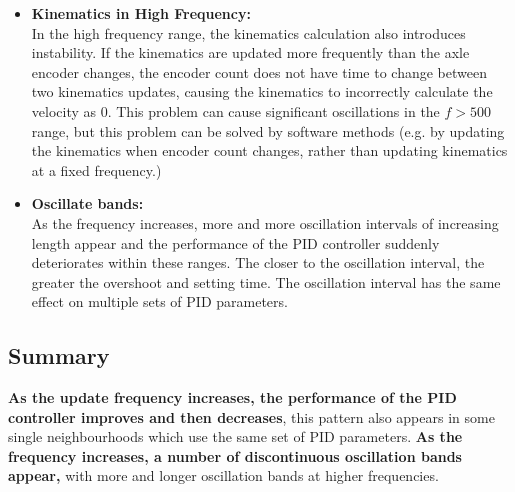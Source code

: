 \documentclass[conference]{IEEEtran}
\begin{document}
\begin{itemize}
\begin{enumerate}
    \end{enumerate}
    \item \textbf{Kinematics in High Frequency:}\\
    In the high frequency range, the kinematics calculation also introduces instability. If the kinematics are updated more frequently than the axle encoder changes, the encoder count does not have time to change between two kinematics updates, causing the kinematics to incorrectly calculate the velocity as 0. This problem can cause significant oscillations in the $f>500$ range, but this problem can be solved by software methods (e.g. by updating the kinematics when encoder count changes, rather than updating kinematics at a fixed frequency.)
    \item \textbf{Oscillate bands:}\\
    As the frequency increases, more and more oscillation intervals of increasing length appear and the performance of the PID controller suddenly deteriorates within these ranges. The closer to the oscillation interval, the greater the overshoot and setting time. The oscillation interval has the same effect on multiple sets of PID parameters.
\end{itemize}
\subsection{Summary}

\textbf{As the update frequency increases, the performance of the PID controller improves and then decreases}, this pattern also appears in some single neighbourhoods which use the same set of PID parameters. \textbf{As the frequency increases, a number of discontinuous oscillation bands appear,} with more and longer oscillation bands at higher frequencies.

\end{document}
